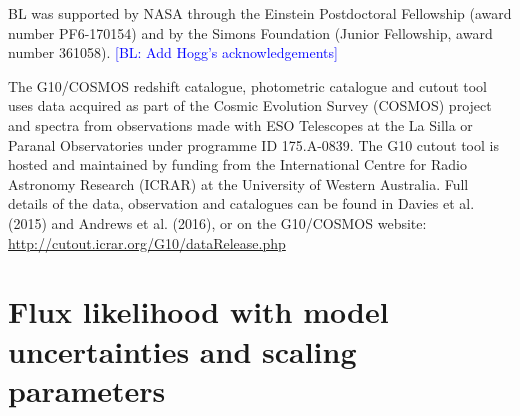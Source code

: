 \documentclass[aps,prd,showpacs,superscriptaddress,groupedaddress]{revtex4}  %
\newcommand{\bl}[1]{\textcolor{blue}{[BL: #1]}}
\begin{document}
BL was supported by NASA through the Einstein Postdoctoral Fellowship (award number PF6-170154) and by the Simons Foundation (Junior Fellowship, award number 361058).
\bl{Add Hogg's acknowledgements}

The G10/COSMOS redshift catalogue, photometric catalogue and cutout tool uses data acquired as part of the Cosmic Evolution Survey (COSMOS) project and spectra from observations made with ESO Telescopes at the La Silla or Paranal Observatories under programme ID 175.A-0839. The G10 cutout tool is hosted and maintained by funding from the International Centre for Radio Astronomy Research (ICRAR) at the University of Western Australia. Full details of the data, observation and catalogues can be found in Davies et al. (2015) and Andrews et al. (2016), or on the G10/COSMOS website: \url{http://cutout.icrar.org/G10/dataRelease.php}



\appendix

\section{Flux likelihood with model uncertainties and scaling parameters}\label{app:fluxlikelihood}
\end{document}
